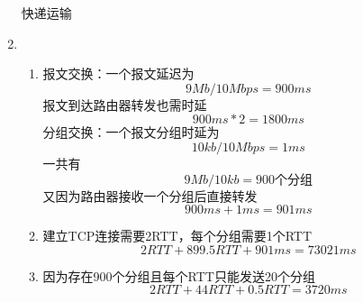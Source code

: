 \documentclass{article}
\begin{document}
\begin{enumerate}
          快递运输
    \item \begin{enumerate}[label=(\arabic*)]
        \item 报文交换：一个报文延迟为
              \begin{equation}
                9Mb/10Mbps=900ms
              \end{equation}
              报文到达路由器转发也需时延
              \begin{equation}
                900ms*2=1800ms
              \end{equation}
              分组交换：一个报文分组时延为
              \begin{equation}
                10kb/10Mbps=1ms
              \end{equation}
              一共有
              \begin{equation}
                9Mb/10kb=900\text{个分组}
              \end{equation}
              又因为路由器接收一个分组后直接转发
              \begin{equation}
                900ms+1ms=901ms
              \end{equation}
        \item 建立TCP连接需要2RTT，每个分组需要1个RTT
              \begin{equation}
                2RTT+899.5RTT+901ms=73021ms
              \end{equation}
        \item 因为存在900个分组且每个RTT只能发送20个分组
              \begin{equation}
                2RTT+44RTT+0.5RTT=3720ms
              \end{equation}
    \end{enumerate}      
\end{enumerate}
\end{document}
